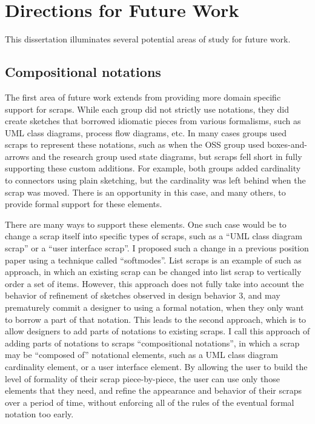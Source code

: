 \documentclass[12pt,fleqn]{ucithesis}
\begin{document}
\section{Directions for Future Work}
This dissertation illuminates several potential areas of study for future work. 

\subsection{Compositional notations}

The first area of future work extends from providing more domain specific support for scraps. While each group did not strictly use notations, they did create sketches that borrowed idiomatic pieces from various formalisms, such as UML class diagrams, process flow diagrams, etc. In many cases groups used scraps to represent these notations, such as when the OSS group used boxes-and-arrows and the research group used state diagrams, but scraps fell short in fully supporting these custom additions. For example, both groups added cardinality to connectors using plain sketching, but the cardinality was left behind when the scrap was moved. There is an opportunity in this case, and many others, to provide formal support for these elements. 

There are many ways to support these elements. One such case would be to change a scrap itself into specific types of scraps, such as a ``UML class diagram scrap'' or a ``user interface scrap''. I proposed such a change in a previous position paper using a technique called ``softmodes''. List scraps is an example of such as approach, in which an existing scrap can be changed into list scrap to vertically order a set of items. However, this approach does not fully take into account the behavior of refinement of sketches observed in design behavior 3, and may prematurely commit a designer to using a formal notation, when they only want to borrow a part of that notation. This leads to the second approach, which is to allow designers to add parts of notations to existing scraps. I call this approach of adding parts of notations to scraps ``compositional notations'', in which a scrap may be ``composed of'' notational elements, such as a UML class diagram cardinality element, or a user interface element. By allowing the user to build the level of formality of their scrap piece-by-piece, the user can use only those elements that they need, and refine the appearance and behavior of their scraps over a period of time, without enforcing all of the rules of the eventual formal notation too early. 
\end{document}
